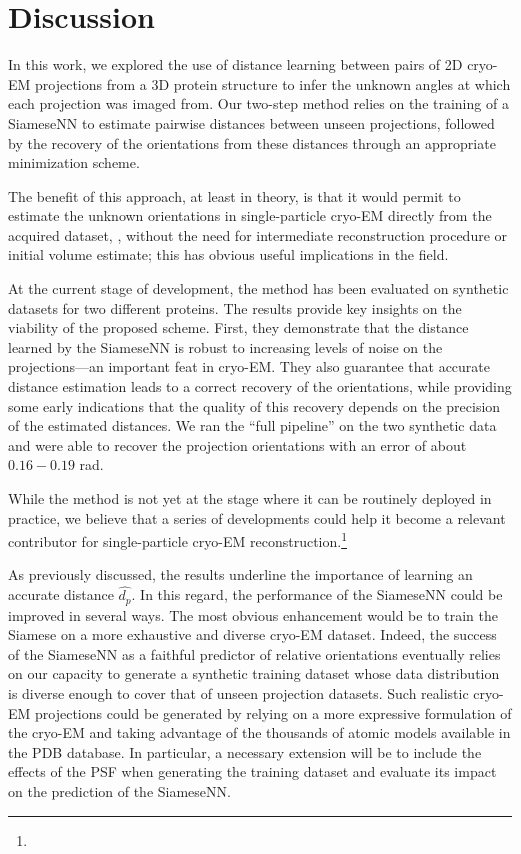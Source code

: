 \section{Discussion}
\label{sec:discussion}

In this work, we explored the use of distance learning between pairs of 2D cryo-EM projections from a 3D protein structure to infer the unknown angles at which each projection was imaged from. Our two-step method relies on the training of a SiameseNN to estimate pairwise distances between unseen projections, followed by the recovery of the orientations from these distances through an appropriate minimization scheme. 

The benefit of this approach, at least in theory, is that it would permit to estimate the unknown orientations in single-particle cryo-EM directly from the acquired dataset, \ie, without the need for intermediate reconstruction procedure or initial volume estimate; this has obvious useful implications in the field.  

At the current stage of development, the method has been evaluated on synthetic datasets for two different proteins. The results provide key insights on the viability of the proposed scheme. First, they demonstrate that the distance learned by the SiameseNN is robust to increasing levels of noise on the projections---an important feat in cryo-EM. They also guarantee that accurate distance estimation leads to a correct recovery of the orientations, while providing some early indications that the quality of this recovery depends on the precision of the estimated distances. We ran the ``full pipeline'' on the two synthetic data and were able to recover the projection orientations with an error of about $0.16-0.19$ rad. 

While the method is not yet at the stage where it can be routinely deployed in practice, we believe that a series of developments could help it become a relevant contributor for single-particle cryo-EM reconstruction.\footnote{} 

As previously discussed, the results underline the importance of learning an accurate distance $\widehat{d_p}$. In this regard, the performance of the SiameseNN could be improved in several ways. The most obvious enhancement would be to train the Siamese on a more exhaustive and diverse cryo-EM dataset. Indeed, the success of the SiameseNN as a faithful predictor of relative orientations eventually relies on our capacity to generate a synthetic training dataset whose data distribution is diverse enough to cover that of unseen projection datasets. Such realistic cryo-EM projections could be generated by relying on a more expressive formulation of the cryo-EM and taking advantage of the thousands of atomic models available in the PDB database. In particular, a necessary extension will be to include the effects of the PSF when generating the training dataset and evaluate its impact on the prediction of the SiameseNN. 


